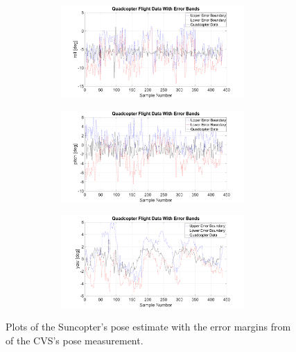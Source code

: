\begin{figure}
\begin{subfigure}{0.48\textwidth}
\begin{subfigure}{\textwidth}
    \end{subfigure}
    \caption{}
  \end{subfigure}
  \begin{subfigure}{0.48\textwidth}
    \begin{subfigure}{\textwidth}
      \includegraphics[clip, trim = 100 0 100 0, width = \textwidth]{figures/chapter5/ts_roll}
    \end{subfigure}
    \begin{subfigure}{\textwidth}
      \includegraphics[clip, trim = 100 0 100 0, width = \textwidth]{figures/chapter5/ts_pitch}
    \end{subfigure}
    \begin{subfigure}{\textwidth}
      \includegraphics[clip, trim = 100 0 100 0, width = \textwidth]{figures/chapter5/ts_yaw}
    \end{subfigure}
    \caption{}
  \end{subfigure}
\caption[Plots of the Suncopter's flight and measurement errors.]{Plots of the Suncopter's pose estimate with the error margins from of the CVS's pose measurement. }
\label{fig:chap5-results}
\end{figure}

